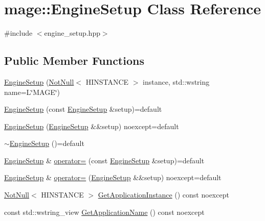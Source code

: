 \hypertarget{classmage_1_1_engine_setup}{}\section{mage\+:\+:Engine\+Setup Class Reference}
\label{classmage_1_1_engine_setup}


{\ttfamily \#include $<$engine\+\_\+setup.\+hpp$>$}

\subsection*{Public Member Functions}
\begin{DoxyCompactItemize}
\item 
\mbox{\hyperlink{classmage_1_1_engine_setup_a32d98da01edc1a6acf1a220d3114efb1}{Engine\+Setup}} (\mbox{\hyperlink{namespacemage_a8769f9d670d6b585ea306cb1062af94b}{Not\+Null}}$<$ H\+I\+N\+S\+T\+A\+N\+CE $>$ instance, std\+::wstring name=L\char`\"{}M\+A\+GE\char`\"{})
\item 
\mbox{\hyperlink{classmage_1_1_engine_setup_a40980f5fce1554c2a93707efdf4486a9}{Engine\+Setup}} (const \mbox{\hyperlink{classmage_1_1_engine_setup}{Engine\+Setup}} \&setup)=default
\item 
\mbox{\hyperlink{classmage_1_1_engine_setup_a22b87954ad7a2bc26ff7f26fb443c58c}{Engine\+Setup}} (\mbox{\hyperlink{classmage_1_1_engine_setup}{Engine\+Setup}} \&\&setup) noexcept=default
\item 
\mbox{\hyperlink{classmage_1_1_engine_setup_a0480bee101756b72233a1aa7d44eb185}{$\sim$\+Engine\+Setup}} ()=default
\item 
\mbox{\hyperlink{classmage_1_1_engine_setup}{Engine\+Setup}} \& \mbox{\hyperlink{classmage_1_1_engine_setup_a4234ca6df84db6a2005b994ed42da11f}{operator=}} (const \mbox{\hyperlink{classmage_1_1_engine_setup}{Engine\+Setup}} \&setup)=default
\item 
\mbox{\hyperlink{classmage_1_1_engine_setup}{Engine\+Setup}} \& \mbox{\hyperlink{classmage_1_1_engine_setup_a4c2e71f96f138b28fd6ff1c088d05a53}{operator=}} (\mbox{\hyperlink{classmage_1_1_engine_setup}{Engine\+Setup}} \&\&setup) noexcept=default
\item 
\mbox{\hyperlink{namespacemage_a8769f9d670d6b585ea306cb1062af94b}{Not\+Null}}$<$ H\+I\+N\+S\+T\+A\+N\+CE $>$ \mbox{\hyperlink{classmage_1_1_engine_setup_a278a3df908b5b369a597812de4010532}{Get\+Application\+Instance}} () const noexcept
\item 
const std\+::wstring\+\_\+view \mbox{\hyperlink{classmage_1_1_engine_setup_a45863627ae7cfdd92b6b059d4538359d}{Get\+Application\+Name}} () const noexcept
\end{DoxyCompactItemize}
